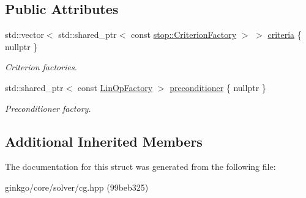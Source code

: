 \subsection*{Public Attributes}
\begin{DoxyCompactItemize}
\item 
\mbox{\label{structgko_1_1solver_1_1Cg_1_1parameters__type_af8544e18d6657180b3a13a98c79e4fa8}} 
std\+::vector$<$ std\+::shared\+\_\+ptr$<$ const \hyperlink{group__stop_gab12a51109c50b35ec36dc5a393d6a9a0}{stop\+::\+Criterion\+Factory} $>$ $>$ \hyperlink{structgko_1_1solver_1_1Cg_1_1parameters__type_af8544e18d6657180b3a13a98c79e4fa8}{criteria} \{ nullptr \}
\begin{DoxyCompactList}\small\item\em Criterion factories. \end{DoxyCompactList}\item 
\mbox{\label{structgko_1_1solver_1_1Cg_1_1parameters__type_ab319c47fc1c31ad73d58c6aac4fdea6f}} 
std\+::shared\+\_\+ptr$<$ const \hyperlink{classgko_1_1LinOpFactory}{Lin\+Op\+Factory} $>$ \hyperlink{structgko_1_1solver_1_1Cg_1_1parameters__type_ab319c47fc1c31ad73d58c6aac4fdea6f}{preconditioner} \{ nullptr \}
\begin{DoxyCompactList}\small\item\em Preconditioner factory. \end{DoxyCompactList}\end{DoxyCompactItemize}
\subsection*{Additional Inherited Members}


The documentation for this struct was generated from the following file\+:\begin{DoxyCompactItemize}
\item 
ginkgo/core/solver/cg.\+hpp (99beb325)\end{DoxyCompactItemize}
